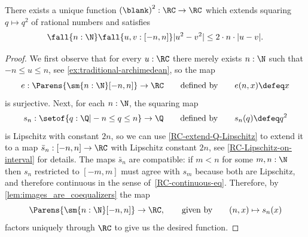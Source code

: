 %
\begin{thm} \label{RC-squaring}
  There exists a unique function ${(\blank)}^2 : \RC \to \RC$ which extends squaring $q \mapsto
  q^2$ of rational numbers and satisfies
  \begin{equation*}
    \fall{n : \N}
    \fall{u, v : [-n, n]}
    |u^2 - v^2| \leq 2 \cdot n \cdot |u - v|.
  \end{equation*}
\end{thm}

\begin{proof}
  We first observe that for every $u : \RC$ there merely exists $n : \N$ such that $-n
  \leq u \leq n$, see \cref{ex:traditional-archimedean}, so the map
  \begin{equation*}
    e : \Parens{\sm{n : \N} [-n, n]} \to \RC
    \qquad\text{defined by}\qquad
    e(n, x) \defeq x
  \end{equation*}
  is surjective. Next, for each $n : \N$, the squaring map
  \begin{equation*}
    s_n : \setof{ q : \Q | -n \leq q \leq n } \to \Q
    \qquad\text{defined by}\qquad
    s_n(q) \defeq q^2
  \end{equation*}
  is Lipschitz with constant $2 n$, so we can use \cref{RC-extend-Q-Lipschitz} to
  extend it to a map $\bar{s}_n : [-n, n] \to \RC$ with Lipschitz constant $2 n$, see
  \cref{RC-Lipschitz-on-interval} for details. The maps $\bar{s}_n$ are compatible: if
  $m < n$ for some $m, n : \N$ then $s_n$ restricted to $[-m, m]$ must agree with $s_m$
  because both are Lipschitz, and therefore continuous in the sense
  of~\cref{RC-continuous-eq}. Therefore, by \cref{lem:images_are_coequalizers} the map
  \begin{equation*}
    \Parens{\sm{n : \N} [-n, n]} \to \RC,
    \qquad\text{given by}\qquad
    (n, x) \mapsto s_n(x)
  \end{equation*}
  factors uniquely through $\RC$ to give us the desired function.
\end{proof}
